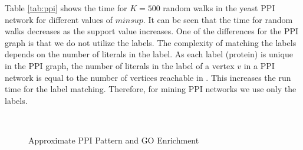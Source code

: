 \smallskip{} Table \ref{tab:ppi} shows the
time for $K=500$ random walks in the yeast PPI network for different
values of $minsup$.  It can be seen that the time for random walks
decreases as the support value increases.  One of the differences for
the PPI graph is that we do not utilize the \khop labels.  The
complexity of matching the \khop labels depends on the number of
literals in the \khop label.  As each label (protein) is unique in the
PPI graph, the number of literals in the \khop label of a vertex $v$ in
a PPI network is equal to the number of vertices reachable in \khops.
This increases the run time for the \khop label matching.  Therefore,
for mining PPI networks we use only the \ncl labels.


\begin{figure}[!ht]
  \\
    \caption{Approximate PPI Pattern and GO Enrichment}
    \label{fig:ppipats}
\end{figure}

